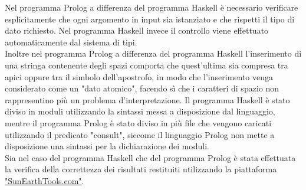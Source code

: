 \documentclass{article}
\begin{document}
Nel programma Prolog a differenza del programma Haskell è necessario verificare esplicitamente che ogni argomento in input sia istanziato e che rispetti il tipo di dato richiesto. Nel programma Haskell invece il controllo viene effettuato automaticamente dal sistema di tipi.\\
Inoltre nel programma Prolog a differenza del programma Haskell l'inserimento di una stringa contenente degli spazi comporta che quest'ultima sia compresa tra apici oppure tra il simbolo dell'apostrofo, in modo che l'inserimento venga considerato come un "dato atomico",  facendo sì che i caratteri di spazio non rappresentino più un problema d'interpretazione.
Il programma Haskell è stato diviso in moduli utilizzando la sintassi messa a disposizione dal linguaggio, mentre il programma Prolog è stato diviso in più file che vengono caricati utilizzando il predicato "consult", siccome il linguaggio Prolog non mette a disposizione una sintassi per la dichiarazione dei moduli.\\
Sia nel caso del programma Haskell che del programma Prolog è stata effettuata la verifica della correttezza dei risultati restituiti utilizzando la piattaforma \href{https://www.sunearthtools.com/it/tools/distance.php}{"SunEarthTools.com"}.
\end{document}
